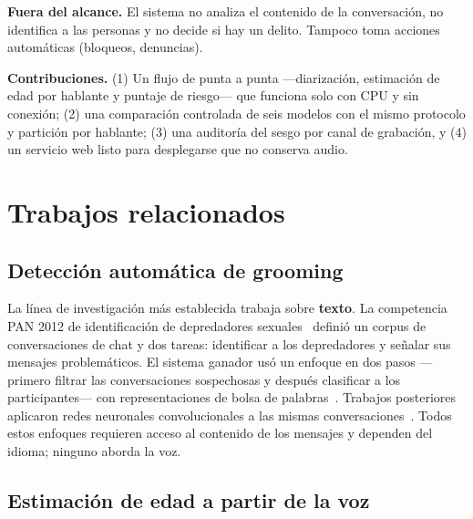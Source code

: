 \documentclass[11pt,a4paper]{article}
\begin{document}
\textbf{Fuera del alcance.} El sistema no analiza el contenido de la conversación, no identifica a las personas y no decide si hay un delito. Tampoco toma acciones automáticas (bloqueos, denuncias).

\textbf{Contribuciones.} (1) Un flujo de punta a punta ---diarización, estimación de edad por hablante y puntaje de riesgo--- que funciona solo con CPU y sin conexión; (2) una comparación controlada de seis modelos con el mismo protocolo y partición por hablante; (3) una auditoría del sesgo por canal de grabación, y (4) un servicio web listo para desplegarse que no conserva audio.

\section{Trabajos relacionados}
\label{sec:trabajos}

\subsection{Detección automática de grooming}

La línea de investigación más establecida trabaja sobre \textbf{texto}. La competencia PAN 2012 de identificación de depredadores sexuales~\cite{pan2012} definió un corpus de conversaciones de chat y dos tareas: identificar a los depredadores y señalar sus mensajes problemáticos. El sistema ganador usó un enfoque en dos pasos ---primero filtrar las conversaciones sospechosas y después clasificar a los participantes--- con representaciones de bolsa de palabras~\cite{villatoro2012}. Trabajos posteriores aplicaron redes neuronales convolucionales a las mismas conversaciones~\cite{ebrahimi2016}. Todos estos enfoques requieren acceso al contenido de los mensajes y dependen del idioma; ninguno aborda la voz.

\subsection{Estimación de edad a partir de la voz}
\end{document}
